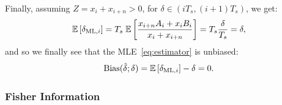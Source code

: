 \noindent
Finally, assuming \(Z=x_i+x_{i+n}>0\), for \(\delta \in(iT_s,(i+1)T_s)\), we get:
\begin{equation}
\mathbb{E}\left[{\delta_{\mathrm{ML}, i}}\right]
=
T_s\;\mathbb{E}\left[{
\frac{x_{i+n}A_i+x_iB_i}{x_i+x_{i+n}}
}\right]
= T_s\frac{\delta}{T_s}=\delta,
\end{equation}
and so we finally see that the MLE~\eqref{eq:estimator} is unbiased:
\begin{equation}
\operatorname{Bias}(\hat{\delta};\delta)
=\mathbb{E}\left[{\delta_{\mathrm{ML}, i}}\right] -\delta=0.
\end{equation}

\noindent
\subsubsection{Fisher Information}

